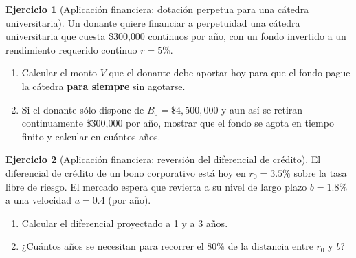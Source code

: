 \documentclass[11pt,a4paper,oneside]{article}
\theoremstyle{definition}
\newtheorem{tarea}{Ejercicio}
\begin{document}
\begin{tarea}[Aplicación financiera: dotación perpetua para una cátedra universitaria]
Un donante quiere financiar a perpetuidad una cátedra universitaria que
cuesta \$300{,}000 continuos por año, con un fondo invertido a un
rendimiento requerido continuo $r=5\%$.
\begin{enumerate}[label=(\alph*)]
  \item Calcular el monto $V$ que el donante debe aportar hoy para que
  el fondo pague la cátedra \textbf{para siempre} sin agotarse.
  \item Si el donante sólo dispone de $B_0=\$4{,}500{,}000$ y aun así se
  retiran continuamente \$300{,}000 por año, mostrar que el fondo se
  agota en tiempo finito y calcular en cuántos años.
\end{enumerate}
\end{tarea}

\begin{tarea}[Aplicación financiera: reversión del diferencial de crédito]
El diferencial de crédito de un bono corporativo está hoy en
$r_0=3.5\%$ sobre la tasa libre de riesgo. El mercado espera que
revierta a su nivel de largo plazo $b=1.8\%$ a una velocidad $a=0.4$
(por año).
\begin{enumerate}[label=(\alph*)]
  \item Calcular el diferencial proyectado a 1 y a 3 años.
  \item ¿Cuántos años se necesitan para recorrer el 80\% de la
  distancia entre $r_0$ y $b$?
\end{enumerate}
\end{tarea}
\end{document}
